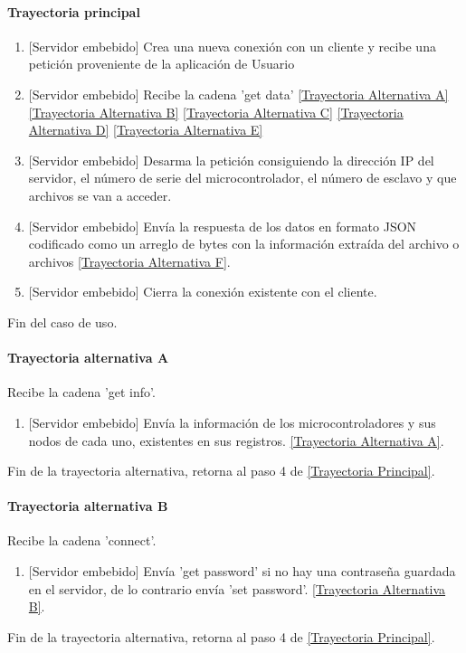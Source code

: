 \paragraph{Trayectoria principal}
\label{SUB-M-CU1.4:TP}
	\begin{enumerate}
		\item {[Servidor embebido]} Crea una nueva conexión con un cliente y recibe una petición proveniente de la aplicación de Usuario
		
		\item {[Servidor embebido]} Recibe la cadena 'get data'
		\hyperref[SUB-M-CU1.4:TA]{[Trayectoria Alternativa A]}
		\hyperref[SUB-M-CU1.4:TB]{[Trayectoria Alternativa B]}
		\hyperref[SUB-M-CU1.4:TC]{[Trayectoria Alternativa C]}
		\hyperref[SUB-M-CU1.4:TD]{[Trayectoria Alternativa D]}
		\hyperref[SUB-M-CU1.4:TE]{[Trayectoria Alternativa E]}
		
		\item {[Servidor embebido]} Desarma la petición consiguiendo la dirección IP del servidor, el número de serie del microcontrolador, el número de esclavo y que archivos se van a acceder.
		
		\item {[Servidor embebido]} Envía la respuesta de los datos en formato JSON codificado como un arreglo de bytes con la información extraída del archivo o archivos \hyperref[SUB-M-CU1.4:TF]{[Trayectoria Alternativa F]}.
		
		\item {[Servidor embebido]} Cierra la conexión existente con el cliente.
	
	\end{enumerate}
	Fin del caso de uso.

\paragraph{Trayectoria alternativa A} \label{SUB-M-CU1.4:TA}
	Recibe la cadena 'get info'.
	\begin{enumerate}[label=A\arabic*.]
		\item {[Servidor embebido]} Envía la información de los microcontroladores y sus nodos de cada uno, existentes en sus registros.
		\hyperref[SUB-M-CU1.4:TA]{[Trayectoria Alternativa A]}.
	\end{enumerate}
	Fin de la trayectoria alternativa, retorna al paso 4 de  \hyperref[SUB-M-CU1.4:TP]{[Trayectoria Principal]}.
	
\paragraph{Trayectoria alternativa B} \label{SUB-M-CU1.4:TB}
	Recibe la cadena 'connect'.
	\begin{enumerate}[label=B\arabic*.]
		\item {[Servidor embebido]} Envía 'get password' si no hay una contraseña guardada en el servidor, de lo contrario envía 'set password'.
		\hyperref[SUB-M-CU1.4:TB]{[Trayectoria Alternativa B]}.
	\end{enumerate}
	Fin de la trayectoria alternativa, retorna al paso 4 de  \hyperref[SUB-M-CU1.4:TP]{[Trayectoria Principal]}.
	

